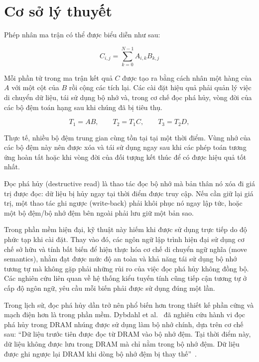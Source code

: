 \documentclass[a4paper]{article}
\begin{document}
	\section{Cơ sở lý thuyết}
	
	
	Phép nhân ma trận có thể được biểu diễn như sau:
	
	\begin{equation}
		C_{i,j} = \sum_{k=0}^{N-1} A_{i,k}B_{k,j}
	\end{equation}
	
	Mỗi phần tử trong ma trận kết quả $C$ được tạo ra bằng cách nhân một hàng của $A$ với một cột của $B$ rồi cộng các tích lại. Các cài đặt hiệu quả phải quản lý việc di chuyển dữ liệu, tái sử dụng bộ nhớ và, trong cơ chế đọc phá hủy, vòng đời của các bộ đệm toán hạng sau khi chúng đã bị tiêu thụ.
	
	\begin{equation}
	T_1 = A B,\qquad
	T_2 = T_1 C,\qquad
	T_3 = T_2 D,
	\end{equation}
	
	Thực tế, nhiều bộ đệm trung gian cùng tồn tại tại một thời điểm. Vùng nhớ của các bộ đệm này nên được xóa và tái sử dụng ngay sau khi các phép toán tương ứng hoàn tất hoặc khi vòng đời của đối tượng kết thúc để có được hiệu quả tốt nhất.
	
	
	Đọc phá hủy (destructive read) là thao tác đọc bộ nhớ mà bản thân nó xóa đi giá trị được đọc: dữ liệu bị hủy ngay tại thời điểm được truy cập. Nếu cần giữ lại giá trị, một thao tác ghi ngược (write-back) phải khôi phục nó ngay lập tức, hoặc một bộ đệm/bộ nhớ đệm bên ngoài phải lưu giữ một bản sao.
	
	Trong phần mềm hiện đại, kỹ thuật này hiếm khi được sử dụng trực tiếp do độ phức tạp khi cài đặt. Thay vào đó, các ngôn ngữ lập trình hiện đại sử dụng cơ chế sở hữu và tính bất biến để hiện thực hóa cơ chế di chuyển ngữ nghĩa (move semantics), nhằm đạt được mức độ an toàn và khả năng tái sử dụng bộ nhớ tương tự mà không gặp phải những rủi ro của việc đọc phá hủy không đồng bộ. Các nghiên cứu liên quan về hệ thống kiểu tuyến tính cũng tiếp cận tương tự ở cấp độ ngôn ngữ, yêu cầu mỗi biến phải được sử dụng đúng một lần.
	
	Trong lịch sử, đọc phá hủy dần trở nên phổ biến hơn trong thiết kế phần cứng và mạch điện hơn là trong phần mềm. Dybdahl et al.~\cite{DybdahlKGN06} đã nghiên cứu hành vi đọc phá hủy trong DRAM nhúng được sử dụng làm bộ nhớ chính, dựa trên cơ chế sau: ``Dữ liệu trước tiên được đọc từ DRAM vào bộ nhớ đệm. Tại thời điểm này, dữ liệu không được lưu trong DRAM mà chỉ nằm trong bộ nhớ đệm. Dữ liệu được ghi ngược lại DRAM khi dòng bộ nhớ đệm bị thay thế''~\cite{DybdahlKGN06}.
    
\end{document}
